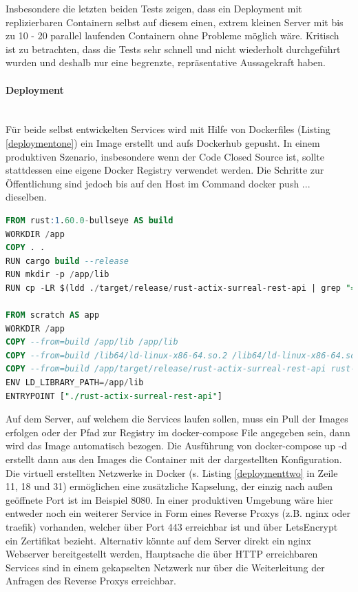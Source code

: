 \documentclass[notitlepage, hidelinks]{article}
\begin{document}
Insbesondere die letzten beiden Tests zeigen, dass ein Deployment mit replizierbaren Containern selbst auf diesem einen, extrem kleinen Server mit bis zu 10 - 20 parallel laufenden Containern ohne Probleme möglich wäre. Kritisch ist zu betrachten, dass die Tests sehr schnell und nicht wiederholt durchgeführt wurden und deshalb nur eine begrenzte, repräsentative Aussagekraft haben.

\paragraph{Deployment} \mbox{} \\
Für beide selbst entwickelten Services wird mit Hilfe von Dockerfiles (Listing \ref{deploymentone}) ein Image erstellt und aufs Dockerhub gepusht. In einem produktiven Szenario, insbesondere wenn der Code Closed Source ist, sollte stattdessen eine eigene Docker Registry verwendet werden. Die Schritte zur Öffentlichung sind jedoch bis auf den Host im Command docker push ... dieselben. 

\begin{lstlisting}[language=SQL,frame=single,caption=Dockerfile für die Erstellung des REST-API Images ,label=deploymentone]
FROM rust:1.60.0-bullseye AS build
WORKDIR /app
COPY . .
RUN cargo build --release
RUN mkdir -p /app/lib
RUN cp -LR $(ldd ./target/release/rust-actix-surreal-rest-api | grep "=>" | cut -d ' ' -f 3) /app/lib

FROM scratch AS app
WORKDIR /app
COPY --from=build /app/lib /app/lib
COPY --from=build /lib64/ld-linux-x86-64.so.2 /lib64/ld-linux-x86-64.so.2
COPY --from=build /app/target/release/rust-actix-surreal-rest-api rust-actix-surreal-rest-api
ENV LD_LIBRARY_PATH=/app/lib
ENTRYPOINT ["./rust-actix-surreal-rest-api"]
\end{lstlisting}

Auf dem Server, auf welchem die Services laufen sollen, muss ein Pull der Images erfolgen oder der Pfad zur Registry im docker-compose File angegeben sein, dann wird das Image automatisch bezogen. Die Ausführung von docker-compose up -d erstellt dann aus den Images die Container mit der dargestellten Konfiguration. Die virtuell erstellten Netzwerke in Docker (s. Listing \ref{deploymenttwo} in Zeile 11, 18 und 31) ermöglichen eine zusätzliche Kapselung, der einzig nach außen geöffnete Port ist im Beispiel 8080. In einer produktiven Umgebung wäre hier entweder noch ein weiterer Service in Form eines Reverse Proxys (z.B. nginx oder traefik) vorhanden, welcher über Port 443 erreichbar ist und über LetsEncrypt ein Zertifikat bezieht. Alternativ könnte auf dem Server direkt ein nginx Webserver bereitgestellt werden, Hauptsache die über HTTP erreichbaren Services sind in einem gekapselten Netzwerk nur über die Weiterleitung der Anfragen des Reverse Proxys erreichbar. 
\end{document}
